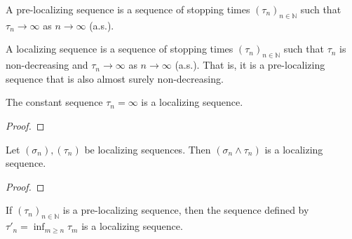 \begin{definition}\label{def:preLocalizingSequence}
  \leanok
A pre-localizing sequence is a sequence of stopping times $(\tau_n)_{n \in \mathbb{N}}$ such that $\tau_n \to \infty$ as $n \to \infty$ (a.s.).
\end{definition}


\begin{definition}\label{def:localizingSequence}
  \leanok
A localizing sequence is a sequence of stopping times $(\tau_n)_{n \in \mathbb{N}}$ such that $\tau_n$ is non-decreasing and $\tau_n \to \infty$ as $n \to \infty$ (a.s.).
That is, it is a pre-localizing sequence that is also almost surely non-decreasing.
\end{definition}


\begin{lemma}\label{lem:localizingSequence_const_top}
  \leanok
The constant sequence $\tau_n = \infty$ is a localizing sequence.
\end{lemma}

\begin{proof}\leanok

\end{proof}


\begin{lemma}\label{lem:localizingSequence_min}
  \leanok
Let $(\sigma_n), (\tau_n)$ be localizing sequences.
Then $(\sigma_n \wedge \tau_n)$ is a localizing sequence.
\end{lemma}

\begin{proof}\leanok

\end{proof}


\begin{lemma}\label{lem:isLocalizingSequence_of_isPreLocalizingSequence}
  \leanok
If $(\tau_n)_{n \in \mathbb{N}}$ is a pre-localizing sequence, then the sequence defined by $\tau'_n = \inf_{m \ge n} \tau_m$ is a localizing sequence.
\end{lemma}


